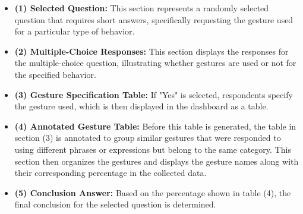 \documentclass{CSSRforAfrica}
\begin{document}
\begin{itemize}
    \item \textbf{(1) Selected Question:} This section represents a randomly selected question that requires short answers, specifically requesting the gesture used for a particular type of behavior.
    
    \item \textbf{(2) Multiple-Choice Responses:} This section displays the responses for the multiple-choice question, illustrating whether gestures are used or not for the specified behavior.
    
    \item \textbf{(3) Gesture Specification Table:} If "Yes" is selected, respondents specify the gesture used, which is then displayed in the dashboard as a table.
    
    \item \textbf{(4) Annotated Gesture Table:} Before this table is generated, the table in section (3) is annotated to group similar gestures that were responded to using different phrases or expressions but belong to the same category. This section then organizes the gestures and displays the gesture names along with their corresponding percentage in the collected data.
    
    \item \textbf{(5) Conclusion Answer:} Based on the percentage shown in table (4), the final conclusion for the selected question is determined.
\end{itemize}
\newpage
\end{document}
